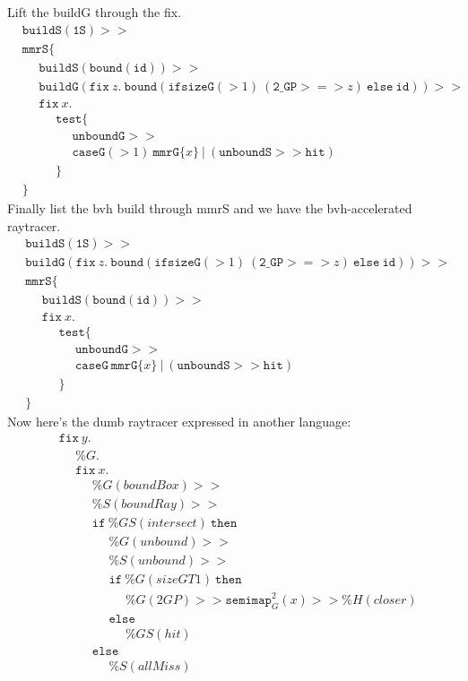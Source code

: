 \documentclass{article}
\newcommand {\fix}{\mathtt{fix}}
\newcommand {\test}{\mathtt{test}}
\newcommand {\isect}{\mathtt{hit}}
\newcommand {\buildG}{\mathtt{buildG}}
\newcommand {\buildS}{\mathtt{buildS}}
\newcommand {\id}{\mathtt{id}}
\newcommand {\unboundG}{\mathtt{unboundG}}
\newcommand {\unboundS}{\mathtt{unboundS}}
\newcommand {\mmrG}{\mathtt{mmrG}}
\newcommand {\mmrS}{\mathtt{mmrS}}
\newcommand {\oneS}{\mathtt{1S}}
\newcommand {\twoGP}{\mathtt{2\_GP}}
\newcommand {\semimap}{\mathtt{semimap}}
\newcommand {\bound}{\mathtt{bound}}
\newcommand {\tab}{~~~~~~}
\begin{document}
Lift the buildG through the fix.
\begin{align*}
&\buildS (\oneS) >> \\
&\mmrS \{ \\
&\tab \buildS(\bound (\mathtt{id})) >> \\
&\tab \buildG (\fix~z.~\bound(\mathtt{ifsizeG}(>1)~(\twoGP >=> z)~\mathtt{else}~\id)) >> \\
&\tab\fix~x. \\
&\tab\tab\test \{ \\
&\tab\tab\tab \unboundG >> \\
&\tab\tab\tab \mathtt{caseG}(>1)~\mmrG \{x\}~|~(\unboundS >> \isect)\\
&\tab \tab \} \\
&\}
\end{align*}
Finally list the bvh build through mmrS and we have the bvh-accelerated raytracer.
\begin{align*}
&\buildS (\oneS) >> \\
&\buildG (\fix~z.~\bound(\mathtt{ifsizeG}(>1)~(\twoGP >=> z)~\mathtt{else}~\id)) >> \\
&\mmrS \{ \\
&\tab \buildS(\bound (\mathtt{id})) >> \\
&\tab\fix~x. \\
&\tab\tab\test \{ \\
&\tab\tab\tab \unboundG >> \\
&\tab\tab\tab \mathtt {caseG}~\mmrG\{x\}~|~(\unboundS>>\isect) \\
&\tab \tab \} \\
&\}
\end{align*}
Now here's the dumb raytracer expressed in another language:
\begin{align*}
&\fix~y. \\
&\tab \%G. \\
&\tab \fix~x. \\
&\tab\tab \%G(boundBox) >> \\
&\tab\tab \%S(boundRay) >> \\
&\tab\tab \mathtt{if}~\%GS(intersect)~\mathtt{then} \\
&\tab\tab\tab \%G(unbound) >> \\
&\tab\tab\tab \%S(unbound) >> \\
&\tab\tab\tab \mathtt{if}~\%G(sizeGT1)~\mathtt{then}\\
&\tab\tab\tab\tab \%G(2GP) >> \semimap_G^{2}(x) >> \%H(closer) \\
&\tab\tab\tab \mathtt{else}\\
&\tab\tab\tab\tab \%GS(hit)  \\
&\tab\tab \mathtt{else} \\
&\tab\tab\tab \%S(allMiss)\\
&
\end{align*}
\end{document}

